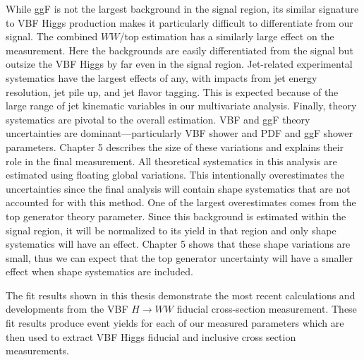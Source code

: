 While ggF is not the largest background in the signal region, its similar signature to VBF Higgs production makes it particularly difficult to differentiate from our signal. The combined $WW$/top estimation has a similarly large effect on the measurement. Here the backgrounds are easily differentiated from the signal but outsize the VBF Higgs by far even in the signal region. Jet-related experimental systematics have the largest effects of any, with impacts from jet energy resolution, jet pile up, and jet flavor tagging. This is expected because of the large range of jet kinematic variables in our multivariate analysis. Finally, theory systematics are pivotal to the overall estimation. VBF and ggF theory uncertainties are dominant---particularly VBF shower and PDF and ggF shower parameters. Chapter 5 describes the size of these variations and explains their role in the final measurement. All theoretical systematics in this analysis are estimated using floating global variations. This intentionally overestimates the uncertainties since the final analysis will contain shape systematics that are not accounted for with this method. One of the largest overestimates comes from the top generator theory parameter. Since this background is estimated within the signal region, it will be normalized to its yield in that region and only shape systematics will have an effect. Chapter 5 shows that these shape variations are small, thus we can expect that the top generator uncertainty will have a smaller effect when shape systematics are included. 

The fit results shown in this thesis demonstrate the most recent calculations and developments from the VBF $H\rightarrow WW$ fiducial cross-section measurement. These fit results produce event yields for each of our measured parameters which are then used to extract VBF Higgs fiducial and inclusive cross section measurements.

